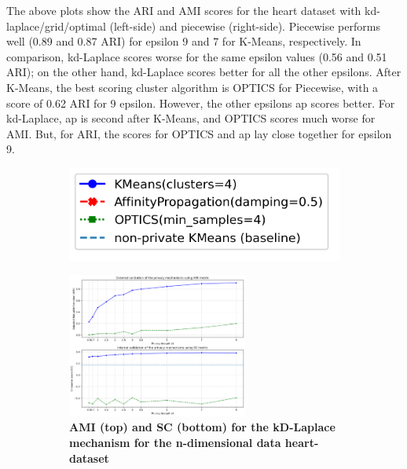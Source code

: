 The above plots show the ARI and AMI scores for the heart dataset with kd-laplace/grid/optimal (left-side) and piecewise (right-side).
Piecewise performs well (0.89 and 0.87 ARI) for epsilon 9 and 7 for K-Means, respectively.
In comparison, kd-Laplace scores worse for the same epsilon values (0.56 and 0.51 ARI); on the other hand, kd-Laplace scores better for all the other epsilons.
After K-Means, the best scoring cluster algorithm is OPTICS for Piecewise, with a score of 0.62 ARI for 9 epsilon.
However, the other epsilons \gls{ap} scores better. For kd-Laplace, \gls{ap} is second after K-Means, and OPTICS scores much worse for AMI.
But, for ARI, the scores for OPTICS and \gls{ap} lay close together for epsilon 9.
\newpage
\begin{figure}[H]
    \centering
    \begin{subfigure}{0.30\textwidth}
        \includegraphics[width=\textwidth]{Results/2d-laplace/seeds-dataset/legend.png}
    \end{subfigure}
    \begin{subfigure}{1\textwidth}
        \caption{\textbf{AMI (top) and SC (bottom) for the kD-Laplace mechanism for the n-dimensional data heart-dataset}}
        \centering
        \includegraphics[width=0.65\textwidth]{Results/kd-laplace/kd-Laplace/heart-dataset/ami-and-sc_10_dimensions.png}
        \centering
    \end{subfigure}
    \begin{subfigure}{1\textwidth}

\end{subfigure}
\end{figure}
